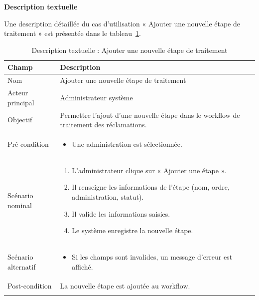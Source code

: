 \textbf{Description textuelle}

Une description détaillée du cas d’utilisation « Ajouter une nouvelle étape de traitement » est présentée dans le tableau~\ref{tab:ajouter-etape-traitement}.

 \renewcommand{\arraystretch}{1.3}

\begin{longtable}{|p{4cm}|p{12cm}|}
\hline
\rowcolor{gray!20}
\textbf{Champ} & \textbf{Description} \\ 
\hline
\endfirsthead

 

Nom & Ajouter une nouvelle étape de traitement \\ \hline

Acteur principal & Administrateur système \\ \hline

Objectif & Permettre l’ajout d’une nouvelle étape dans le workflow de traitement des réclamations. \\ \hline

Pré-condition &
\begin{itemize}
    \item Une administration est sélectionnée.
\end{itemize}
\\ \hline

Scénario nominal &
\begin{enumerate}
    \item L’administrateur clique sur « Ajouter une étape ».
    \item Il renseigne les informations de l’étape (nom, ordre, administration, statut).
    \item Il valide les informations saisies.
    \item Le système enregistre la nouvelle étape.
\end{enumerate}
\\ \hline

Scénario alternatif &
\begin{itemize}
    \item Si les champs sont invalides, un message d’erreur est affiché.
\end{itemize}
\\ \hline

Post-condition &
La nouvelle étape est ajoutée au workflow. \\ \hline

\caption{Description textuelle : Ajouter une nouvelle étape de traitement}
\label{tab:ajouter-etape-traitement}

\end{longtable}


